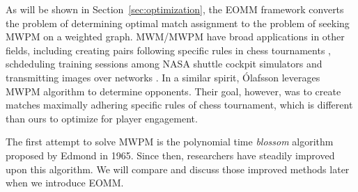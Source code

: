 As will be shown in Section~\ref{sec:optimization}, the EOMM framework converts the problem of determining optimal match assignment to the problem of seeking MWPM on a weighted graph. MWM/MWPM have broad applications in other fields, including creating pairs following specific rules in chess tournaments \cite{olafsson1990weighted}, schdeduling training sessions among NASA shuttle cockpit simulators \cite{bell1994weighted} and transmitting images over networks \cite{riskin1994index}. In a similar spirit, \'{O}lafsson \cite{olafsson1990weighted} leverages MWPM algorithm to determine opponents. Their goal, however, was to create matches maximally adhering specific rules of chess tournament, which is different than ours to optimize for player engagement.

The first attempt to solve MWPM is the polynomial time \textit{blossom} algorithm proposed by Edmond \cite{edmonds1965maximum,edmonds1965paths} in 1965. Since then, researchers have steadily improved upon this algorithm. We will compare and discuss those improved methods later when we introduce EOMM.

%
%






